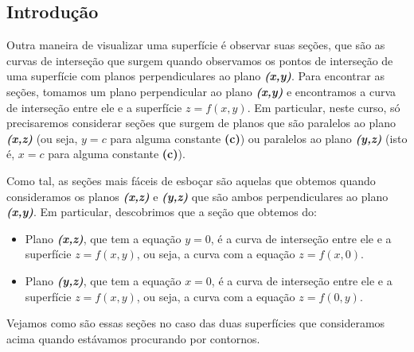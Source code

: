 \documentclass[a4paper]{article}
\begin{document}
\subsection*{Introdução}
Outra maneira de visualizar uma superfície é observar suas seções, que são as curvas de interseção que surgem quando observamos os pontos de interseção de uma superfície com planos perpendiculares ao plano \textit{\textbf{(x,y)}}. Para encontrar as seções, tomamos um plano perpendicular ao plano \textit{\textbf{(x,y)}} e encontramos a curva de interseção entre ele e a superfície $z = f(x,y)$. Em particular, neste curso, só precisaremos considerar seções que surgem de planos que são paralelos ao plano \textit{\textbf{(x,z)}} (ou seja, $y = c$ para alguma constante \textbf{(c)}) ou paralelos ao plano \textit{\textbf{(y,z)}} (isto é, $x = c$ para alguma constante \textbf{(c)}).
\par Como tal, as seções mais fáceis de esboçar são aquelas que obtemos quando consideramos os planos \textit{\textbf{(x,z)}} e \textit{\textbf{(y,z)}} que são ambos perpendiculares ao plano \textit{\textbf{(x,y)}}. Em particular, descobrimos que a seção que obtemos do:
    \begin{itemize}
        \item Plano \textit{\textbf{(x,z)}}, que tem a equação $y = 0$, é a curva de interseção entre ele e a superfície $z = f(x,y)$, ou seja, a curva com a equação $z = f(x,0)$.
        \item Plano \textit{\textbf{(y,z)}}, que tem a equação $x = 0$, é a curva de interseção entre ele e a superfície $z = f(x,y)$, ou seja, a curva com a equação $z = f(0,y)$.
    \end{itemize}
    Vejamos como são essas seções no caso das duas superfícies que consideramos acima quando estávamos procurando por contornos.
\end{document}
